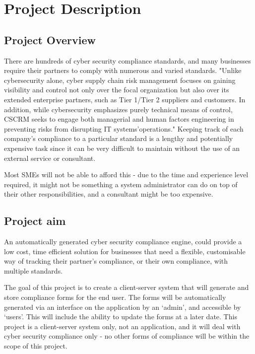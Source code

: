 \chapter{Project Description} \label{Chapter:one}
    \section{Project Overview}
        There are hundreds of cyber security compliance standards, and many businesses require their partners to comply with numerous and varied standards. "Unlike cybersecurity alone, cyber supply chain risk management focuses on gaining visibility and control not only over the focal organization but also over its extended enterprise partners, such as Tier 1/Tier 2 suppliers and customers. In addition, while cybersecurity emphasizes purely technical means of control, CSCRM seeks to engage both managerial and human factors engineering in preventing risks from disrupting IT systems\textquoteright operations."\cite{Gunn:2001:pdflatex} Keeping track of each company\textquoteright s compliance to a particular standard is a lengthy and potentially expensive task since it can be very difficult to maintain without the use of an external service or consultant.

        Most SMEs will not be able to afford this - due to the time and experience level required, it might not be something a system administrator can do on top of their other responsibilities, and a consultant might be too expensive.

    \section{Project aim}
        An automatically generated cyber security compliance engine, could provide a low cost, time efficient solution for businesses that need a flexible, customisable way of tracking their partner\textquoteright s compliance, or their own compliance, with multiple standards.

        The goal of this project is to create a client-server system that will generate and store compliance forms for the end user. The forms will be automatically generated via an interface on the application by an \textquoteleft admin\textquoteright, and accessible by \textquoteleft users\textquoteright. This will include the ability to update the forms at a later date. This project is a client-server system only, not an application, and it will deal with cyber security compliance only - no other forms of compliance will be within the scope of this project.
